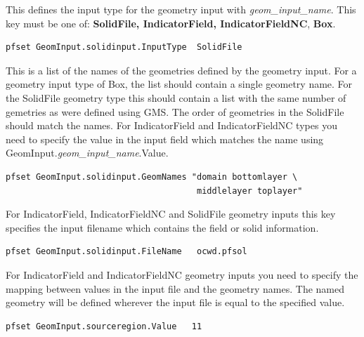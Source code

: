 {
This defines the input type for the geometry input with
{\em geom\_input\_name}.
This key must be one of: {\bf SolidFile, IndicatorField, IndicatorFieldNC}, {\bf Box}.
}
\begin{display}\begin{verbatim}
pfset GeomInput.solidinput.InputType  SolidFile
\end{verbatim}\end{display}

{
This is a list of the names of the geometries defined by the geometry
input.  For a geometry input type of Box, the list should contain a
single geometry name.  For the SolidFile geometry type this should
contain a list with the same number of gemetries as were defined
using GMS.  The order of geometries in the SolidFile should match the
names.  For IndicatorField and IndicatorFieldNC types you need to specify the value in the
input field which matches the name using
GeomInput.{\em geom\_input\_name}.Value.
}
\begin{display}\begin{verbatim}
pfset GeomInput.solidinput.GeomNames "domain bottomlayer \
                                      middlelayer toplayer"
\end{verbatim}\end{display}

{
For IndicatorField, IndicatorFieldNC and SolidFile geometry inputs this key specifies
the input filename which contains the field or solid information.
}
\begin{display}\begin{verbatim}
pfset GeomInput.solidinput.FileName   ocwd.pfsol
\end{verbatim}\end{display}


{
For IndicatorField and IndicatorFieldNC geometry inputs you need to specify the mapping between
values in the input file and the geometry names.  The named geometry will
be defined wherever the input file is equal to the specified value.
}
\begin{display}\begin{verbatim}
pfset GeomInput.sourceregion.Value   11
\end{verbatim}\end{display}

